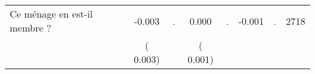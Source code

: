 \begin{tabular}{l*{7}{c}}
 Ce ménage en est-il membre ?       &             -0.003       &            .  &              0.000       &            .  &             -0.001       &                  . &  2718 \\ 
                       &       (       0.003)             &                               &       (       0.001)                     &                               &                                               &                                &                      \\ 

\hline \end{tabular}